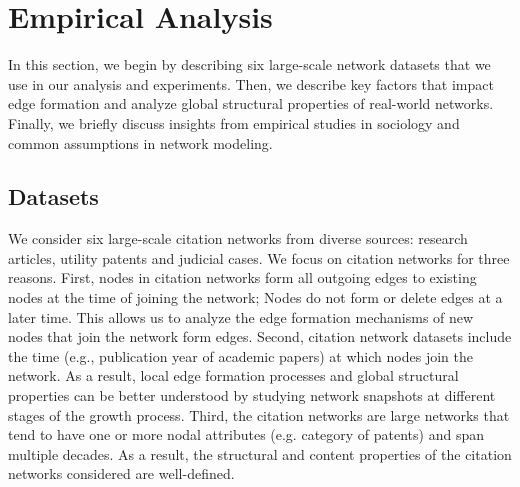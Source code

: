 \section{Empirical Analysis}
\label{sec:Analysis}

In this section, we begin by describing six large-scale network datasets that we use in our
analysis and experiments. Then, we
describe key factors that impact edge formation and analyze global structural
properties of real-world networks. Finally, we briefly discuss insights from
empirical studies in sociology and common assumptions in network modeling.

\subsection{Datasets}
\label{sec:Datasets}

We consider six large-scale citation networks from diverse sources: research articles,
utility patents and judicial cases.
We focus on citation networks for three reasons. First, nodes in citation networks
form all outgoing edges to existing nodes at the time of joining the network; Nodes do
not form or delete edges at a later time. This allows us to analyze
the edge formation mechanisms of new nodes that join the network form edges.
Second, citation network datasets include the time (e.g., publication year of academic
papers) at which nodes join the network. As a result, local edge formation
processes and global structural properties can be better understood by studying
network snapshots at different stages of the growth process. Third, the citation
networks are large networks that tend to have one or more nodal attributes (e.g. category of patents)
and span multiple decades. As a result, the structural and content properties of the citation
networks considered are well-defined.


